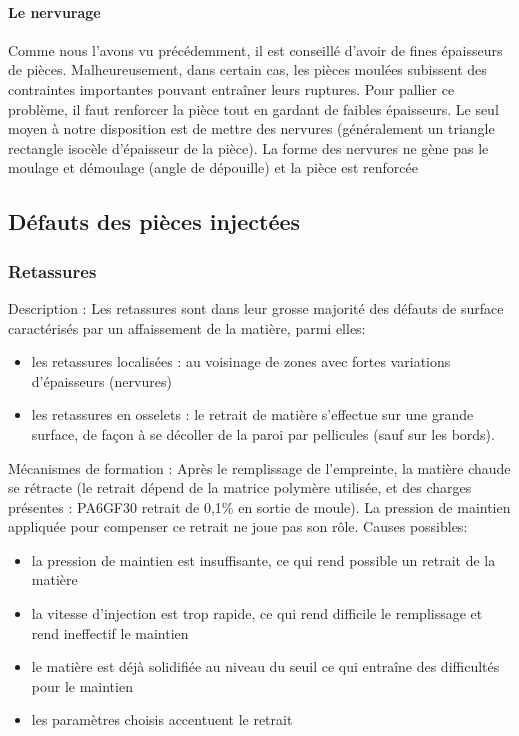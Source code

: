 \documentclass[11pt,oneside]{article}
\begin{document}
\paragraph{Le nervurage}

        Comme nous l'avons vu précédemment, il est conseillé d'avoir de fines
épaisseurs de 
pièces.  Malheureusement,  dans  certain  cas,  les  pièces  moulées  subissent 
des  contraintes 
importantes pouvant entraîner leurs ruptures. 
        Pour  pallier  ce  problème,  il  faut  renforcer  la  pièce  tout  en 
gardant  de  faibles 
épaisseurs. Le seul moyen à notre disposition est de mettre des nervures
(généralement un 
triangle rectangle isocèle d'épaisseur de la pièce). 
        La forme des nervures ne gène pas le moulage et démoulage (angle de
dépouille) et 
la pièce est renforcée 
 \subsection{Défauts des pièces injectées}
        \subsubsection{Retassures}
        Description : 
        Les retassures sont dans leur grosse majorité des défauts de surface
caractérisés par 
un affaissement de la matière, parmi elles: 

\begin{itemize}
 \item les  retassures  localisées :  au  voisinage  de  zones  avec  fortes 
variations  d’épaisseurs 
        (nervures) 
 \item les retassures en osselets : le retrait de matière s’effectue sur une
grande surface, de 
        façon à se décoller de la paroi par pellicules (sauf sur les bords).
\end{itemize}
 
         
        Mécanismes de formation : 
        Après le remplissage de l’empreinte, la matière chaude se rétracte (le
retrait dépend 
de la matrice polymère utilisée, et des charges présentes : PA6GF30 retrait de
0,1\% en sortie 
de  moule).  La  pression  de  maintien  appliquée  pour  compenser  ce  retrait
 ne  joue  pas  son 
rôle. 
        Causes possibles: 
\begin{itemize}
 \item la pression de maintien est insuffisante, ce qui rend possible un retrait
de la matière 
 \item la  vitesse  d’injection  est  trop  rapide,  ce  qui  rend  difficile 
le remplissage  et  rend ineffectif le maintien 
 \item le matière est déjà solidifiée au niveau du seuil ce qui entraîne des
difficultés pour le maintien 
 \item les paramètres choisis accentuent le retrait 
\end{itemize}
\end{document}
